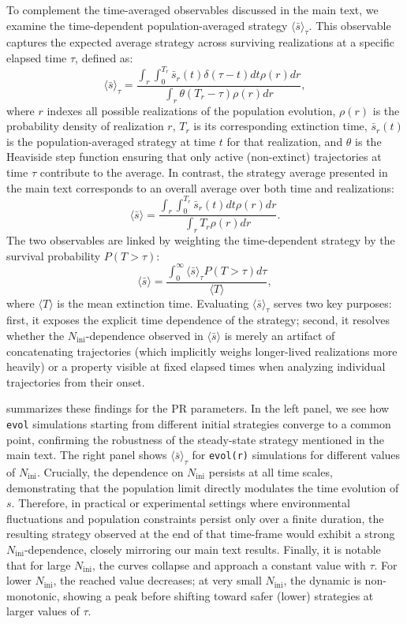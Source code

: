 \documentclass[aps,pre,reprint,10pt,superscriptaddress,onecolumn]{revtex4-2}
\begin{document}
To complement the time-averaged observables discussed in the main text, we examine the time-dependent population-averaged strategy $\langle\bar{s}\rangle_\tau$. This observable captures the expected average strategy across surviving realizations at a specific elapsed time $\tau$, defined as:
\begin{equation}
    \langle\bar{s}\rangle_\tau=\frac{\int_r\int_0^{T_r}\bar{s}_r(t)\delta(\tau-t)dt\rho(r)dr}{\int_r\theta(T_r-\tau)\rho(r)dr},
\end{equation}
where $r$ indexes all possible realizations of the population evolution, $\rho(r)$ is the probability density of realization $r$, $T_r$ is its corresponding extinction time, $\bar{s}_r(t)$ is the population-averaged strategy at time $t$ for that realization, and $\theta$ is the Heaviside step function ensuring that only active (non-extinct) trajectories at time $\tau$ contribute to the average. In contrast, the strategy average presented in the main text corresponds to an overall average over both time and realizations:
\begin{equation}
    \langle\bar{s}\rangle=\frac{\int_r\int_0^{T_r}\bar{s}_r(t)dt\rho(r)dr}{\int_rT_r\rho(r)dr}.
\end{equation}
The two observables are linked by weighting the time-dependent strategy by the survival probability $P(T > \tau)$:
\begin{equation}
    \langle\bar{s}\rangle = \frac{\int_0^\infty\langle\bar{s}\rangle_\tau P(T>\tau)d\tau}{\langle T\rangle},
\end{equation}
where $\langle T\rangle$ is the mean extinction time. Evaluating $\langle\bar{s}\rangle_\tau$ serves two key purposes: first, it exposes the explicit time dependence of the strategy; second, it resolves whether the $N_\text{ini}$-dependence observed in $\langle\bar{s}\rangle$ is merely an artifact of concatenating trajectories (which implicitly weighs longer-lived realizations more heavily) or a property visible at fixed elapsed times when analyzing individual trajectories from their onset.

 summarizes these findings for the PR parameters. In the left panel, we see how \texttt{evol} simulations starting from different initial strategies converge to a common point, confirming the robustness of the steady-state strategy mentioned in the main text. The right panel shows $\langle\bar{s}\rangle_\tau$ for \texttt{evol(r)} simulations for different values of $N_\text{ini}$. Crucially, the dependence on $N_\text{ini}$ persists at all time scales, demonstrating that the population limit directly modulates the time evolution of $s$. Therefore, in practical or experimental settings where environmental fluctuations and population constraints persist only over a finite duration, the resulting strategy observed at the end of that time-frame would exhibit a strong $N_\text{ini}$-dependence, closely mirroring our main text results. Finally, it is notable that for large $N_\text{ini}$, the curves collapse and approach a constant value with $\tau$. For lower $N_\text{ini}$, the reached value decreases; at very small $N_\text{ini}$, the dynamic is non-monotonic, showing a peak before shifting toward safer (lower) strategies at larger values of $\tau$.
\end{document}
